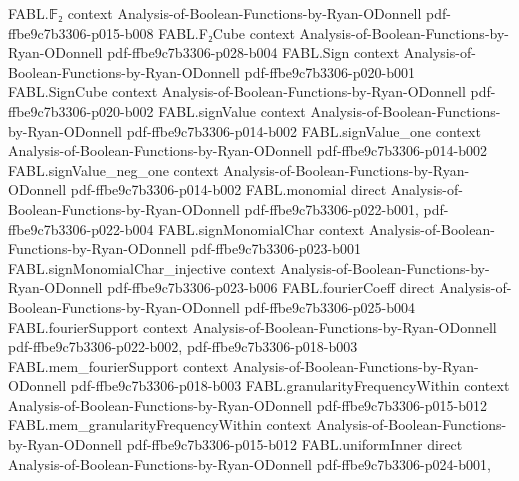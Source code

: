 \begin{theorem}
\label{FABL.allZeroStringTester_rejectionProbability}
\leanok
{}
\proofstep
  {FABL.𝔽₂}
  {context}
  {Analysis-of-Boolean-Functions-by-Ryan-ODonnell}
  {pdf-ffbe9c7b3306-p015-b008}
\proofstep
  {FABL.F₂Cube}
  {context}
  {Analysis-of-Boolean-Functions-by-Ryan-ODonnell}
  {pdf-ffbe9c7b3306-p028-b004}
\proofstep
  {FABL.Sign}
  {context}
  {Analysis-of-Boolean-Functions-by-Ryan-ODonnell}
  {pdf-ffbe9c7b3306-p020-b001}
\proofstep
  {FABL.SignCube}
  {context}
  {Analysis-of-Boolean-Functions-by-Ryan-ODonnell}
  {pdf-ffbe9c7b3306-p020-b002}
\proofstep
  {FABL.signValue}
  {context}
  {Analysis-of-Boolean-Functions-by-Ryan-ODonnell}
  {pdf-ffbe9c7b3306-p014-b002}
\proofstep
  {FABL.signValue_one}
  {context}
  {Analysis-of-Boolean-Functions-by-Ryan-ODonnell}
  {pdf-ffbe9c7b3306-p014-b002}
\proofstep
  {FABL.signValue_neg_one}
  {context}
  {Analysis-of-Boolean-Functions-by-Ryan-ODonnell}
  {pdf-ffbe9c7b3306-p014-b002}
\proofstep
  {FABL.monomial}
  {direct}
  {Analysis-of-Boolean-Functions-by-Ryan-ODonnell}
  {pdf-ffbe9c7b3306-p022-b001,
    pdf-ffbe9c7b3306-p022-b004}
\proofstep
  {FABL.signMonomialChar}
  {context}
  {Analysis-of-Boolean-Functions-by-Ryan-ODonnell}
  {pdf-ffbe9c7b3306-p023-b001}
\proofstep
  {FABL.signMonomialChar_injective}
  {context}
  {Analysis-of-Boolean-Functions-by-Ryan-ODonnell}
  {pdf-ffbe9c7b3306-p023-b006}
\proofstep
  {FABL.fourierCoeff}
  {direct}
  {Analysis-of-Boolean-Functions-by-Ryan-ODonnell}
  {pdf-ffbe9c7b3306-p025-b004}
\proofstep
  {FABL.fourierSupport}
  {context}
  {Analysis-of-Boolean-Functions-by-Ryan-ODonnell}
  {pdf-ffbe9c7b3306-p022-b002,
    pdf-ffbe9c7b3306-p018-b003}
\proofstep
  {FABL.mem_fourierSupport}
  {context}
  {Analysis-of-Boolean-Functions-by-Ryan-ODonnell}
  {pdf-ffbe9c7b3306-p018-b003}
\proofstep
  {FABL.granularityFrequencyWithin}
  {context}
  {Analysis-of-Boolean-Functions-by-Ryan-ODonnell}
  {pdf-ffbe9c7b3306-p015-b012}
\proofstep
  {FABL.mem_granularityFrequencyWithin}
  {context}
  {Analysis-of-Boolean-Functions-by-Ryan-ODonnell}
  {pdf-ffbe9c7b3306-p015-b012}
\proofstep
  {FABL.uniformInner}
  {direct}
  {Analysis-of-Boolean-Functions-by-Ryan-ODonnell}
  {pdf-ffbe9c7b3306-p024-b001,
}
\end{theorem}
